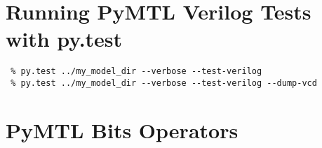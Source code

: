 \documentclass{cbxdoc}
\begin{document}
\section{Running PyMTL Verilog Tests with py.test}

\begin{verbatim}
 % py.test ../my_model_dir --verbose --test-verilog
 % py.test ../my_model_dir --verbose --test-verilog --dump-vcd
\end{verbatim}


\clearpage

\section{PyMTL Bits Operators}

\newenvironment{optbl}[3][0.32in]
{
  \vspace{0pt}\centering
  \BF{#2}\vphantom{g}
  \smallskip

  \begin{tabular}{>{\ttfamily\centering\arraybackslash}p{#1}p{#3}}
\toprule
}{
\bottomrule
  \end{tabular}
}
\end{document}

